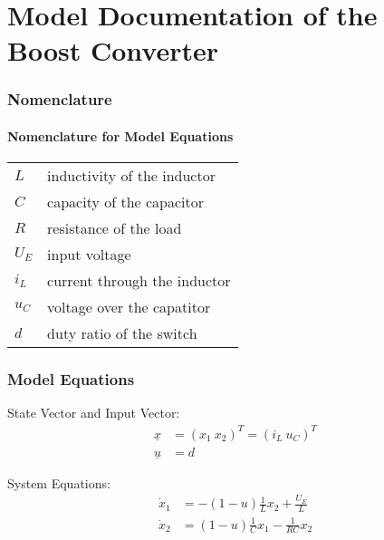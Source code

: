 \documentclass[10pt,a4paper]{article}
\begin{document}
	\part*{Model Documentation of the \\ Boost Converter} %
	
	
	\section{Nomenclature} %
	\subsection{Nomenclature for Model Equations} %
	
	\begin{tabular}{ll}
		$L$ & inductivity of the inductor \\
		$C$ & capacity of the capacitor \\
		$R$ & resistance of the load \\
		$U_E$ & input voltage \\
		$i_L$ & current through the inductor \\
		$u_C$ & voltage over the capatitor \\
		$d$ & duty ratio of the switch \\

		
				
	\end{tabular}
	 
	
	
	\section{Model Equations} %
	
	State Vector and Input Vector:
	\begin{align*}
		\underline{x} &= (x_1 \ x_2)^T = (i_L \ u_C)^T \\
		\underline{u} &= d
	\end{align*}
	
	\noindent System Equations:			
	\begin{subequations}
	\begin{align}
		\dot{x}_1 &= -(1-u)\frac{1}{L}x_2 + \frac{U_E}{L} \\
		\dot{x}_2 &= (1-u)\frac{1}{C}x_1 - \frac{1}{RC}x_2
	\end{align}
	\end{subequations}
\end{document}

